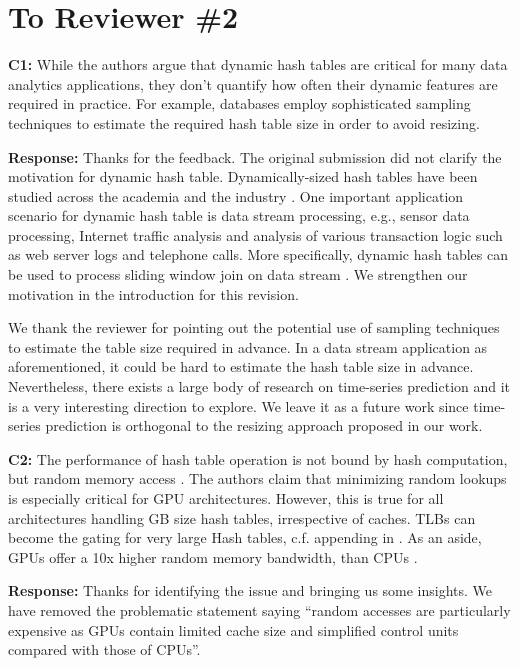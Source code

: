 \section*{To Reviewer \#2}

\begin{shaded}
	\noindent\textbf{C1:} While the authors argue that dynamic hash tables are critical for many data analytics applications, they don't quantify how often their dynamic features are required in practice. For example, databases employ sophisticated sampling techniques to estimate the required hash table size in order to avoid resizing. 
\end{shaded}
%
\noindent\textbf{Response:} 
Thanks for the feedback. The original submission did not clarify the motivation for dynamic hash table. Dynamically-sized hash tables have been studied across the academia \cite{liu2014dynamic,ashkiani2018dynamic} and the industry \cite{larson2003scaleable,douceur2000hash}. 
One important application scenario for dynamic hash table is data stream processing, e.g., sensor data processing, Internet traffic analysis and analysis of various transaction logic such as web server logs and telephone calls. 
More specifically, dynamic hash tables can be used to process sliding window join on data stream \cite{golab2003processing}. We strengthen our motivation in the introduction for this revision.

We thank the reviewer for pointing out the potential use of sampling techniques to estimate the table size required in advance. In a data stream application as aforementioned, it could be hard to estimate the hash table size in advance. Nevertheless, there exists a large body of research on time-series prediction and it is a very interesting direction to explore. We leave it as a future work since time-series prediction is orthogonal to the resizing approach proposed in our work. 



\begin{shaded}
	\noindent\textbf{C2:} The performance of hash table operation is not bound by hash computation, but random memory access \cite{GPU-Join-A}. The authors claim that minimizing random lookups is especially critical for GPU architectures. However, this is true for all architectures handling GB size hash tables, irrespective of caches. TLBs can become the gating for very large Hash tables, c.f. appending in \cite{kaldewey2012gpu}. As an aside, GPUs offer a 10x higher random memory bandwidth, than CPUs \cite{GPU-Join-B}.
\end{shaded}
%
\noindent\textbf{Response:} 
Thanks for identifying the issue and bringing us some insights. 
We have removed the problematic statement saying ``random accesses are particularly expensive as GPUs contain limited cache size and simplified control units compared with those of CPUs''.

